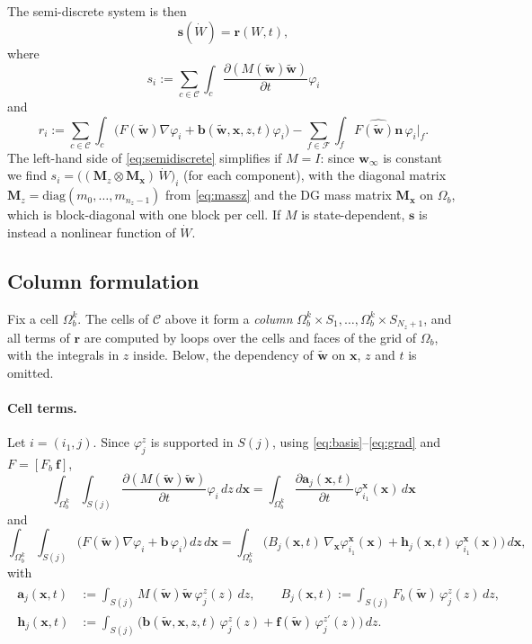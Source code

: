 \documentclass[11pt]{article}
\newcommand{\bw}{\mathbf{w}}
\newcommand{\wt}{\widetilde{\mathbf{w}}}
\newcommand{\bx}{\mathbf{x}}
\newcommand{\bn}{\mathbf{n}}
\newcommand{\bb}{\mathbf{b}}
\newcommand{\bff}{\mathbf{f}}
\newcommand{\ba}{\mathbf{a}}
\newcommand{\Fhat}{\widehat{F(\wt)\bn}}
\begin{document}
	The semi-discrete system is then
	\begin{equation}\label{eq:semidiscrete}
		\mathbf{s}(\dot{W})=\mathbf{r}(W,t),
	\end{equation}
	where
	\begin{equation*}
		s_i:=\sum_{c\in\mathcal{C}}\int_c\frac{\partial (M(\wt)\wt)}{\partial t}\varphi_i
	\end{equation*}
	and
	\begin{equation*}
		r_i:=\sum_{c\in\mathcal{C}}\int_c\Big(F(\wt)\nabla\varphi_i+\bb(\wt,\bx,z,t)\varphi_i\Big)-\sum_{f\in\mathcal{F}}\int_f\Fhat\,\varphi_i\big|_f.
	\end{equation*}
The left-hand side of \eqref{eq:semidiscrete} simplifies if $M=I$: since $\bw_\infty$ is constant we find $s_i=\big((\mathbf{M}_z\otimes\mathbf{M}_\bx)\,\dot{W}\big)_i$ (for each component), with the diagonal matrix $\mathbf{M}_z=\mathrm{diag}(m_0,\dots,m_{n_z-1})$ from \eqref{eq:massz} and the DG mass matrix $\mathbf{M}_\bx$ on $\Omega_b$, which is block-diagonal with one block per cell. If $M$ is state-dependent, $\mathbf{s}$ is instead a nonlinear function of $\dot{W}$.
	
	
	\subsection*{Column formulation}
	
	Fix a cell $\Omega_b^k$. The cells of $\mathcal{C}$ above it form a \emph{column} $\Omega_b^k\times S_1,\dots,\Omega_b^k\times S_{N_z+1}$, and all terms of $\mathbf{r}$ are computed by loops over the cells and faces of the grid of $\Omega_b$, with the integrals in $z$ inside. Below, the dependency of $\wt$ on $\bx$, $z$ and $t$ is omitted.
	
	\paragraph{Cell terms.} Let $i=(i_1,j)$. Since $\varphi^z_j$ is supported in $S(j)$, using \eqref{eq:basis}--\eqref{eq:grad} and $F=[F_b\ \bff]$,
	\[
	\int_{\Omega_b^k}\int_{S(j)}\frac{\partial (M(\wt)\wt)}{\partial t}\varphi_i\,dz\,d\bx = \int_{\Omega_b^k} \frac{\partial \ba_j(\bx,t)}{\partial t}\varphi_{i_1}^\bx(\bx)\,d\bx
	\]
	and
	\[
	\int_{\Omega_b^k}\int_{S(j)}\Big(F(\wt)\nabla\varphi_i+\bb\,\varphi_i\Big)\,dz\,d\bx
	=\int_{\Omega_b^k}\Big(B_j(\bx,t)\,\nabla_\bx\varphi^\bx_{i_1}(\bx)+\mathbf{h}_j(\bx,t)\,\varphi^\bx_{i_1}(\bx)\Big)\,d\bx,
	\]
	with
	\begin{align}
		\begin{split}\label{eq:aBh}
		\ba_j(\bx,t)&:=\int_{S(j)}M(\wt)\wt\,\varphi^z_j(z)\,dz, \qquad
		B_j(\bx,t):=\int_{S(j)}F_b(\wt)\,\varphi^z_j(z)\,dz,\\
		\mathbf{h}_j(\bx,t)&:=\int_{S(j)}\Big(\bb(\wt,\bx,z,t)\,\varphi^z_j(z)+\bff(\wt)\,\varphi^{z\prime}_j(z)\Big)\,dz.
		\end{split}
	\end{align}
	
\end{document}
